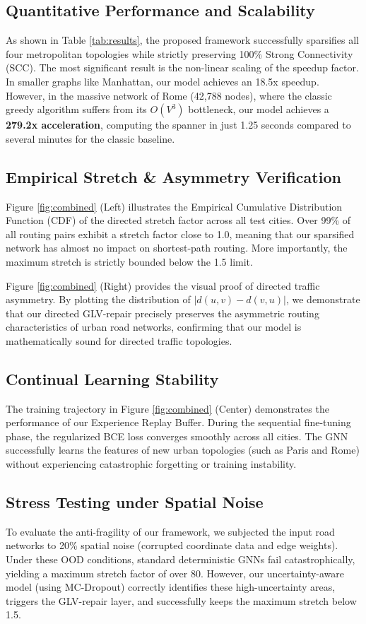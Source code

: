 \documentclass[journal]{IEEEtran}
\begin{document}
\subsection{Quantitative Performance and Scalability}
As shown in Table \ref{tab:results}, the proposed framework successfully sparsifies all four metropolitan topologies while strictly preserving 100\% Strong Connectivity (SCC). The most significant result is the non-linear scaling of the speedup factor. In smaller graphs like Manhattan, our model achieves an 18.5x speedup. However, in the massive network of Rome (42,788 nodes), where the classic greedy algorithm suffers from its $O(V^3)$ bottleneck, our model achieves a \textbf{279.2x acceleration}, computing the spanner in just 1.25 seconds compared to several minutes for the classic baseline.

\subsection{Empirical Stretch \& Asymmetry Verification}
Figure \ref{fig:combined} (Left) illustrates the Empirical Cumulative Distribution Function (CDF) of the directed stretch factor across all test cities. Over 99\% of all routing pairs exhibit a stretch factor close to 1.0, meaning that our sparsified network has almost no impact on shortest-path routing. More importantly, the maximum stretch is strictly bounded below the 1.5 limit.

Figure \ref{fig:combined} (Right) provides the visual proof of directed traffic asymmetry. By plotting the distribution of $|d(u, v) - d(v, u)|$, we demonstrate that our directed GLV-repair precisely preserves the asymmetric routing characteristics of urban road networks, confirming that our model is mathematically sound for directed traffic topologies.

\subsection{Continual Learning Stability}
The training trajectory in Figure \ref{fig:combined} (Center) demonstrates the performance of our Experience Replay Buffer. During the sequential fine-tuning phase, the regularized BCE loss converges smoothly across all cities. The GNN successfully learns the features of new urban topologies (such as Paris and Rome) without experiencing catastrophic forgetting or training instability.

\subsection{Stress Testing under Spatial Noise}
To evaluate the anti-fragility of our framework, we subjected the input road networks to 20\% spatial noise (corrupted coordinate data and edge weights). Under these OOD conditions, standard deterministic GNNs fail catastrophically, yielding a maximum stretch factor of over 80. However, our uncertainty-aware model (using MC-Dropout) correctly identifies these high-uncertainty areas, triggers the GLV-repair layer, and successfully keeps the maximum stretch below 1.5.
\end{document}
